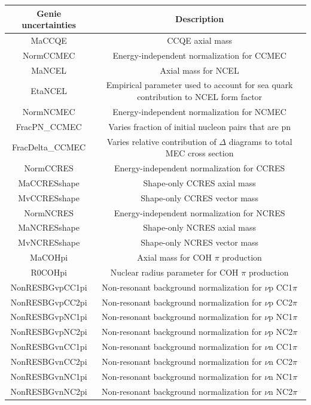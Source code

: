 \begin{table}[H]
\centering
 \begin{tabular}{| c | c |} 
    \hline
\hline
Genie uncertainties & Description\\
\hline
MaCCQE & CCQE axial mass\\
NormCCMEC & Energy-independent normalization for CCMEC\\
MaNCEL & Axial mass for NCEL\\
EtaNCEL & Empirical parameter used to account for sea quark contribution to NCEL form factor\\
NormNCMEC & Energy-independent normalization for NCMEC\\
FracPN\_CCMEC & Varies fraction of initial nucleon pairs that are pn\\
FracDelta\_CCMEC & Varies relative contribution of $\Delta$ diagrams to total MEC cross section\\
NormCCRES & Energy-independent normalization for CCRES\\
MaCCRESshape & Shape-only CCRES axial mass\\
MvCCRESshape & Shape-only CCRES vector mass\\
NormNCRES & Energy-independent normalization for NCRES\\
MaNCRESshape & Shape-only NCRES axial mass\\
MvNCRESshape & Shape-only NCRES vector mass\\
MaCOHpi & Axial mass for COH $\pi$ production\\
R0COHpi & Nuclear radius parameter for COH $\pi$ production\\
NonRESBGvpCC1pi & Non-resonant background normalization for $\nu$p CC1$\pi$\\
NonRESBGvpCC2pi & Non-resonant background normalization for $\nu$p CC2$\pi$\\
NonRESBGvpNC1pi & Non-resonant background normalization for $\nu$p NC1$\pi$\\
NonRESBGvpNC2pi & Non-resonant background normalization for $\nu$p NC2$\pi$\\
NonRESBGvnCC1pi & Non-resonant background normalization for $\nu$n CC1$\pi$\\
NonRESBGvnCC2pi & Non-resonant background normalization for $\nu$n CC2$\pi$\\
NonRESBGvnNC1pi & Non-resonant background normalization for $\nu$n NC1$\pi$\\
NonRESBGvnNC2pi & Non-resonant background normalization for $\nu$n NC2$\pi$\\

\end{tabular}
\end{table}

